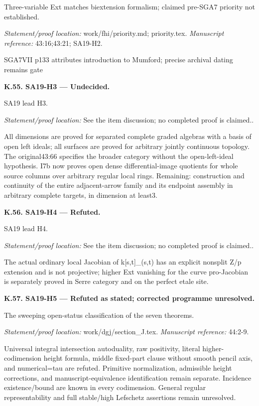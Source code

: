 Three-variable Ext matches biextension formalism; claimed pre-SGA7 priority not established.
\par\emph{Statement/proof location:} work/fhi/priority.md; priority.tex.
\emph{Manuscript reference:} 43:16;43:21; SA19-H2.
\par SGA7VII p133 attributes introduction to Mumford; precise archival dating remains gate
\par\medskip\noindent\textbf{K.55. SA19-H3 --- Undecided.}\par
SA19 lead H3.
\par\emph{Statement/proof location:} See the item discussion; no completed proof is claimed..
\par All dimensions are proved for separated complete graded algebras with a basis of open left ideals; all surfaces are proved for arbitrary jointly continuous topology. The original43:66 specifies the broader category without the open-left-ideal hypothesis. I7b now proves open dense differential-image quotients for whole source columns over arbitrary regular local rings. Remaining: construction and continuity of the entire adjacent-arrow family and its endpoint assembly in arbitrary complete targets, in dimension at least3.
\par\medskip\noindent\textbf{K.56. SA19-H4 --- Refuted.}\par
SA19 lead H4.
\par\emph{Statement/proof location:} See the item discussion; no completed proof is claimed..
\par The actual ordinary local Jacobian of k[s,t]\_(s,t) has an explicit nonsplit Z/p extension and is not projective; higher Ext vanishing for the curve pro-Jacobian is separately proved in Serre category and on the perfect etale site.
\par\medskip\noindent\textbf{K.57. SA19-H5 --- Refuted as stated; corrected programme unresolved.}\par
The sweeping open-status classification of the seven theorems.
\par\emph{Statement/proof location:} work/dgj/section\_J.tex.
\emph{Manuscript reference:} 44:2-9.
\par Universal integral intersection autoduality, raw positivity, literal higher-codimension height formula, middle fixed-part clause without smooth pencil axis, and numerical=tau are refuted. Primitive normalization, admissible height corrections, and manuscript-equivalence identification remain separate. Incidence existence/bound are known in every codimension. General regular representability and full stable/high Lefschetz assertions remain unresolved.
